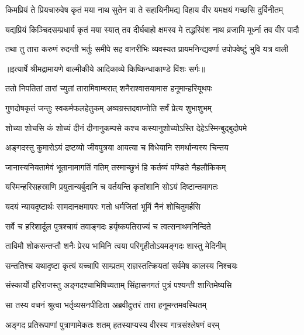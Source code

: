 \fourlineindentedshloka
{किमप्रियं ते प्रियचारुवेष}
{कृतं मया नाथ सुतेन वा ते}
{सहायिनीमद्य विहाय वीर}
{यमक्षयं गच्छसि दुर्विनीतम्} %

\fourlineindentedshloka
{यद्यप्रियं किञ्चिदसम्प्रधार्य}
{कृतं मया स्यात् तव दीर्घबाहो}
{क्षमस्व मे तद्धरिवंश नाथ}
{व्रजामि मूर्ध्ना तव वीर पादौ} %

\fourlineindentedshloka
{तथा तु तारा करुणं रुदन्ती}
{भर्तुः समीपे सह वानरीभिः}
{व्यवस्यत प्रायमनिन्द्यवर्णा}
{उपोपवेष्टुं भुवि यत्र वाली} %


{॥इत्यार्षे श्रीमद्रामायणे वाल्मीकीये आदिकाव्ये किष्किन्धाकाण्डे विंशः सर्गः॥}


\twolineshloka
{ततो निपतितां तारां च्युतां तारामिवाम्बरात्}
{शनैराश्वासयामास हनूमान्हरियूथपः} %

\twolineshloka
{गुणदोषकृतं जन्तुः स्वकर्मफलहेतुकम्}
{अव्यग्रस्तदवाप्नोति सर्वं प्रेत्य शुभाशुभम्} %

\twolineshloka
{शोच्या शोचसि कं शोच्यं दीनं दीनानुकम्पसे}
{कश्च कस्यानुशोच्योऽस्ति देहेऽस्मिन्बुद्बुदोपमे} %

\twolineshloka
{अङ्गदस्तु कुमारोऽयं द्रष्टव्यो जीवपुत्रया}
{आयत्या च विधेयानि समर्थान्यस्य चिन्तय} %

\twolineshloka
{जानास्यनियतामेवं भूतानामागतिं गतिम्}
{तस्माच्छुभं हि कर्तव्यं पण्डिते नैहलौकिकम्} %

\twolineshloka
{यस्मिन्हरिसहस्राणि प्रयुतान्यर्बुदानि च}
{वर्तयन्ति कृतांशानि सोऽयं दिष्टान्तमागतः} %

\twolineshloka
{यदयं न्यायदृष्टार्थः सामदानक्षमापरः}
{गतो धर्मजितां भूमिं नैनं शोचितुमर्हसि} %

\twolineshloka
{सर्वे च हरिशार्दूल पुत्रश्चायं तवाङ्गदः}
{हर्यृष्कपतिराज्यं च त्वत्सनाथमनिन्दिते} %

\twolineshloka
{ताविमौ शोकसन्तप्तौ शनैः प्रेरय भामिनि}
{त्वया परिगृहीतोऽयमङ्गदः शास्तु मेदिनीम्} %

\twolineshloka
{सन्ततिश्च यथादृष्टा कृत्यं यच्चापि साम्प्रतम्}
{राज्ञस्तत्क्रियतां सर्वमेष कालस्य निश्चयः} %

\twolineshloka
{संस्कार्यो हरिराजस्तु अङ्गदश्चाभिषिच्यताम्}
{सिंहासनगतं पुत्रं पश्यन्ती शान्तिमेष्यसि} %

\twolineshloka
{सा तस्य वचनं श्रुत्वा भर्तृव्यसनपीडिता}
{अब्रवीदुत्तरं तारा हनूमन्तमवस्थितम्} %

\twolineshloka
{अङ्गद प्रतिरूपाणां पुत्राणामेकतः शतम्}
{हतस्याप्यस्य वीरस्य गात्रसंश्लेषणं वरम्} %

